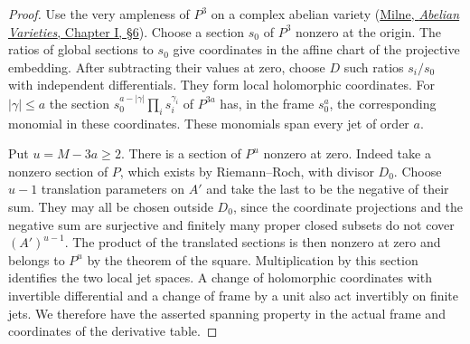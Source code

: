 \documentclass[a4paper,11pt]{article}
\theoremstyle{definition}
\theoremstyle{remark}
\numberwithin{equation}{section}
\begin{document}
\begin{proof}
Use the very ampleness of \(P^3\) on a complex abelian variety
(\href{https://www.jmilne.org/math/CourseNotes/AV.pdf}{Milne,
\emph{Abelian Varieties}, Chapter I, \S6}). Choose a section
\(s_0\) of \(P^3\) nonzero at the origin. The ratios of global
sections to \(s_0\) give coordinates in the affine chart of
the projective embedding. After subtracting their values at
zero, choose \(D\) such ratios \(s_i/s_0\) with independent
differentials. They form local holomorphic coordinates. For
\(|\gamma|\le a\) the section
\(s_0^{a-|\gamma|}\prod_i s_i^{\gamma_i}\) of \(P^{3a}\)
has, in the frame \(s_0^a\), the corresponding monomial in
these coordinates. These monomials span every jet of order \(a\).

Put \(u=M-3a\ge2\). There is a section of \(P^u\) nonzero
at zero. Indeed take a nonzero section of \(P\), which exists
by Riemann--Roch, with divisor \(D_0\). Choose \(u-1\)
translation parameters on \(A'\) and take the last to be
the negative of their sum. They may all be chosen outside
\(D_0\), since the coordinate projections and the negative
sum are surjective and finitely many proper closed subsets
do not cover \((A')^{u-1}\). The product of the translated
sections is then nonzero at zero and belongs to \(P^u\) by
the theorem of the square. Multiplication by this section
identifies the two local jet spaces. A change of holomorphic
coordinates with invertible differential and a change of
frame by a unit also act invertibly on finite jets. We
therefore have the asserted spanning property in the actual
frame and coordinates of the derivative table.
\end{proof}
\end{document}
